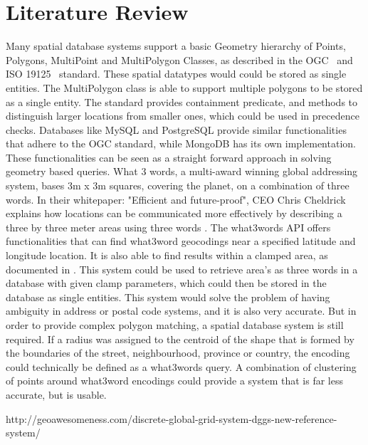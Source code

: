 %
\section{Literature Review}
Many spatial database systems support a basic Geometry hierarchy of Points, Polygons, MultiPoint and MultiPolygon Classes, as described in the OGC~\cite{SFA} and ISO 19125~\cite{ISO-19125} standard. These spatial datatypes would could be stored as single entities. The MultiPolygon class is able to support multiple polygons to be stored as a single entity. The standard provides containment predicate, and methods to distinguish larger locations from smaller ones, which could be used in precedence checks. Databases like MySQL and PostgreSQL provide similar functionalities that adhere to the OGC standard, while MongoDB has its own implementation. These functionalities can be seen as a straight forward approach in solving geometry based queries.
What 3 words, a multi-award winning global addressing system, bases 3m x 3m squares, covering the planet, on a combination of three words. In their whitepaper: "Efficient and future-proof", CEO Chris Cheldrick explains how locations can be communicated more effectively by describing a three by three meter areas using three words \cite{w3w}. The what3words API offers functionalities that can find what3word geocodings near a specified latitude and longitude location. It is also able to find results within a clamped area, as documented in \cite{w3w-api}. This system could be used to retrieve area's as three words in a database with given clamp parameters, which could then be stored in the database as single entities. This system would solve the problem of having ambiguity in address or postal code systems, and it is also very accurate. But in order to provide complex polygon matching, a spatial database system is still required. If a radius was assigned to the centroid of the shape that is formed by the boundaries of the street, neighbourhood, province or country, the encoding could technically be defined as a what3words query. A combination of clustering of points around what3word encodings could provide a system that is far less accurate, but is usable.

http://geoawesomeness.com/discrete-global-grid-system-dggs-new-reference-system/


